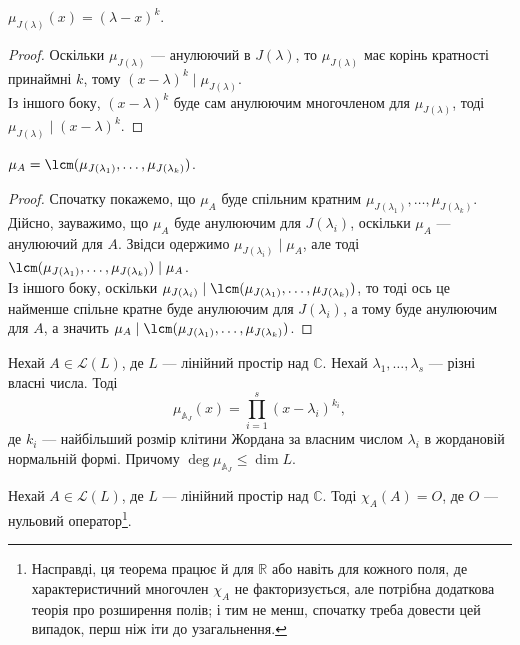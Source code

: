 \documentclass{math_library}
\begin{document}
\begin{corollary}
$\mu_{J(\lambda)}(x) = (\lambda-x)^k$.
\end{corollary}

\begin{proof}
Оскільки $\mu_{J(\lambda)}$ --- анулюючий в $J(\lambda)$, то $\mu_{J(\lambda)}$ має корінь кратності принаймні $k$, тому $(x-\lambda)^k \mid \mu_{J(\lambda)}$.\\
Із іншого боку, $(x-\lambda)^k$ буде сам анулюючим многочленом для $\mu_{J(\lambda)}$, тоді $\mu_{J(\lambda)} \mid (x-\lambda)^k$.
\end{proof}

\begin{proposition}
$\mu_A = \lcm(\mu_{J(\lambda_1)}, \dots, \mu_{J(\lambda_k)})$.
\end{proposition}

\begin{proof}
Спочатку покажемо, що $\mu_A$ буде спільним кратним $\mu_{J(\lambda_1)},\dots,\mu_{J(\lambda_k)}$. Дійсно, зауважимо, що $\mu_A$ буде анулюючим для $J(\lambda_i)$, оскільки $\mu_A$ --- анулюючий для $A$. Звідси одержимо $\mu_{J(\lambda_i)} \mid \mu_A$, але тоді $\lcm(\mu_{J(\lambda_1)}, \dots, \mu_{J(\lambda_k)}) \mid \mu_A$.\\
Із іншого боку, оскільки $\mu_{J(\lambda_i)} \mid \lcm(\mu_{J(\lambda_1)}, \dots, \mu_{J(\lambda_k)})$, то тоді ось це найменше спільне кратне буде анулюючим для $J(\lambda_i)$, а тому буде анулюючим для $A$, а значить $\mu_A \mid \lcm(\mu_{J(\lambda_1)}, \dots, \mu_{J(\lambda_k)})$.
\end{proof}

\begin{corollary}
Нехай $A \in \mathcal{L}(L)$, де $L$ --- лінійний простір над $\mathbb{C}$. Нехай $\lambda_1,\dots,\lambda_s$ --- різні власні числа. Тоді
\[
 \mu_{\mathbb{A}_J}(x) = \displaystyle\prod_{i=1}^s (x - \lambda_i)^{k_i},
 \]
 де $k_i$ --- найбільший розмір клітини Жордана за власним числом $\lambda_i$ в жордановій нормальній формі. Причому $\deg \mu_{\mathbb{A}_J} \leq \dim L$.
\end{corollary}

\begin{theorem}
Нехай $A \in \mathcal{L}(L)$, де $L$ --- лінійний простір над $\mathbb{C}$. Тоді $\chi_A (A) = O$, де $O$ --- нульовий оператор\footnote{Насправді, ця теорема працює й для $\mathbb{R}$ або навіть для кожного поля, де характеристичний многочлен $\chi_A$ не факторизується, але потрібна додаткова теорія про розширення полів; і тим не менш, спочатку треба довести цей випадок, перш ніж іти до узагальнення.}.
\end{theorem}
\end{document}
